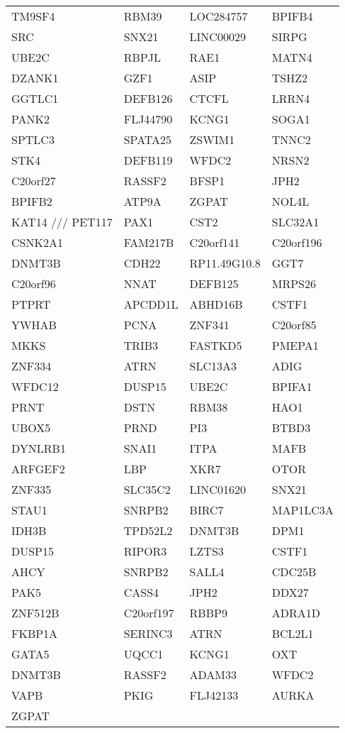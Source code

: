 {\begin{longtable}{llll}
TM9SF4&RBM39&LOC284757&BPIFB4\tabularnewline
SRC&SNX21&LINC00029&SIRPG\tabularnewline
UBE2C&RBPJL&RAE1&MATN4\tabularnewline
DZANK1&GZF1&ASIP&TSHZ2\tabularnewline
GGTLC1&DEFB126&CTCFL&LRRN4\tabularnewline
PANK2&FLJ44790&KCNG1&SOGA1\tabularnewline
SPTLC3&SPATA25&ZSWIM1&TNNC2\tabularnewline
STK4&DEFB119&WFDC2&NRSN2\tabularnewline
C20orf27&RASSF2&BFSP1&JPH2\tabularnewline
BPIFB2&ATP9A&ZGPAT&NOL4L\tabularnewline
KAT14 /// PET117&PAX1&CST2&SLC32A1\tabularnewline
CSNK2A1&FAM217B&C20orf141&C20orf196\tabularnewline
DNMT3B&CDH22&RP11.49G10.8&GGT7\tabularnewline
C20orf96&NNAT&DEFB125&MRPS26\tabularnewline
PTPRT&APCDD1L&ABHD16B&CSTF1\tabularnewline
YWHAB&PCNA&ZNF341&C20orf85\tabularnewline
MKKS&TRIB3&FASTKD5&PMEPA1\tabularnewline
ZNF334&ATRN&SLC13A3&ADIG\tabularnewline
WFDC12&DUSP15&UBE2C&BPIFA1\tabularnewline
PRNT&DSTN&RBM38&HAO1\tabularnewline
UBOX5&PRND&PI3&BTBD3\tabularnewline
DYNLRB1&SNAI1&ITPA&MAFB\tabularnewline
ARFGEF2&LBP&XKR7&OTOR\tabularnewline
ZNF335&SLC35C2&LINC01620&SNX21\tabularnewline
STAU1&SNRPB2&BIRC7&MAP1LC3A\tabularnewline
IDH3B&TPD52L2&DNMT3B&DPM1\tabularnewline
DUSP15&RIPOR3&LZTS3&CSTF1\tabularnewline
\newpage
AHCY&SNRPB2&SALL4&CDC25B\tabularnewline
PAK5&CASS4&JPH2&DDX27\tabularnewline
ZNF512B&C20orf197&RBBP9&ADRA1D\tabularnewline
FKBP1A&SERINC3&ATRN&BCL2L1\tabularnewline
GATA5&UQCC1&KCNG1&OXT\tabularnewline
DNMT3B&RASSF2&ADAM33&WFDC2\tabularnewline
VAPB&PKIG&FLJ42133&AURKA\tabularnewline
ZGPAT&&&\tabularnewline
\bottomrule
\end{longtable}}
\addtocounter{table}{-1}
